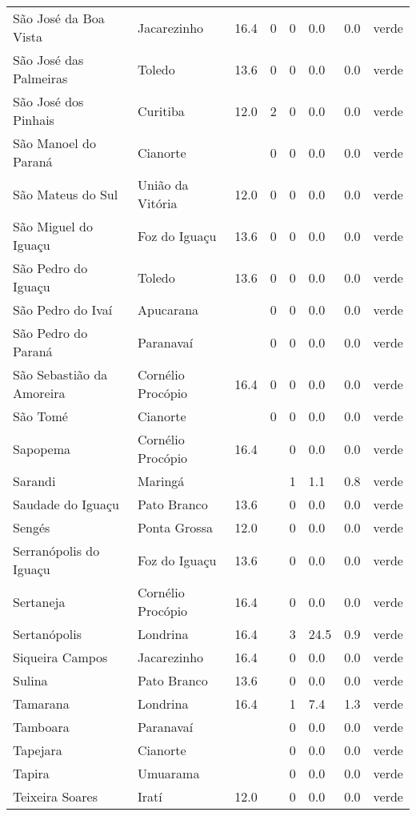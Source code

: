 \begin{longtable}{l|lllllll}
  São José da Boa Vista & Jacarezinho & 16.4 & 0 & 0 & 0.0 & 0.0 & verde \\ 
  São José das Palmeiras & Toledo & 13.6 & 0 & 0 & 0.0 & 0.0 & verde \\ 
  São José dos Pinhais & Curitiba & 12.0 & 2 & 0 & 0.0 & 0.0 & verde \\ 
  São Manoel do Paraná & Cianorte &  & 0 & 0 & 0.0 & 0.0 & verde \\ 
  São Mateus do Sul & União da Vitória & 12.0 & 0 & 0 & 0.0 & 0.0 & verde \\ 
  São Miguel do Iguaçu & Foz do Iguaçu & 13.6 & 0 & 0 & 0.0 & 0.0 & verde \\ 
  São Pedro do Iguaçu & Toledo & 13.6 & 0 & 0 & 0.0 & 0.0 & verde \\ 
  São Pedro do Ivaí & Apucarana &  & 0 & 0 & 0.0 & 0.0 & verde \\ 
  São Pedro do Paraná & Paranavaí &  & 0 & 0 & 0.0 & 0.0 & verde \\ 
  São Sebastião da Amoreira & Cornélio Procópio & 16.4 & 0 & 0 & 0.0 & 0.0 & verde \\ 
  São Tomé & Cianorte &  & 0 & 0 & 0.0 & 0.0 & verde \\ 
  Sapopema & Cornélio Procópio & 16.4 &  & 0 & 0.0 & 0.0 & verde \\ 
  Sarandi & Maringá &  &  & 1 & 1.1 & 0.8 & verde \\ 
  Saudade do Iguaçu & Pato Branco & 13.6 &  & 0 & 0.0 & 0.0 & verde \\ 
  Sengés & Ponta Grossa & 12.0 &  & 0 & 0.0 & 0.0 & verde \\ 
  Serranópolis do Iguaçu & Foz do Iguaçu & 13.6 &  & 0 & 0.0 & 0.0 & verde \\ 
  Sertaneja & Cornélio Procópio & 16.4 &  & 0 & 0.0 & 0.0 & verde \\ 
  Sertanópolis & Londrina & 16.4 &  & 3 & 24.5 & 0.9 & verde \\ 
  Siqueira Campos & Jacarezinho & 16.4 &  & 0 & 0.0 & 0.0 & verde \\ 
  Sulina & Pato Branco & 13.6 &  & 0 & 0.0 & 0.0 & verde \\ 
  Tamarana & Londrina & 16.4 &  & 1 & 7.4 & 1.3 & verde \\ 
  Tamboara & Paranavaí &  &  & 0 & 0.0 & 0.0 & verde \\ 
  Tapejara & Cianorte &  &  & 0 & 0.0 & 0.0 & verde \\ 
  Tapira & Umuarama &  &  & 0 & 0.0 & 0.0 & verde \\ 
  Teixeira Soares & Iratí & 12.0 &  & 0 & 0.0 & 0.0 & verde \\ 

\end{longtable}
